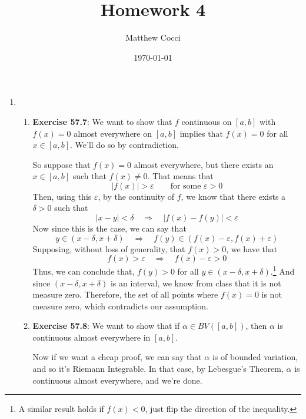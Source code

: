 \documentclass[12pt]{article}
\author{Matthew Cocci}
\title{\textbf{Homework 4}}
\date{\today}
\theoremstyle{plain}
\theoremstyle{definition}
\theoremstyle{remark}
\begin{document}
\maketitle 

\begin{enumerate}

\item 
\begin{enumerate}
\item \textbf{Exercise 57.7}: We want to show that $f$ continuous on $[a,b]$ with $f(x)=0$ almost everywhere on $[a,b]$ implies that $f(x)=0$ for all $x\in[a,b]$. We'll do so by contradiction.

So suppose that $f(x)=0$ almost everywhere, but there exists an $x\in[a,b]$ such that $f(x)\neq 0$. That means that 
\[ 
    |f(x)| > \varepsilon \qquad \text{for some $\varepsilon>0$}
\]
Then, using this $\varepsilon$, by the continuity of $f$, we know that there exists a $\delta>0$ such that
\[
    |x-y|<\delta \quad \Rightarrow \quad |f(x)-f(y)|<\varepsilon
\]
Now since this is the case, we can say that
\[
    y\in(x-\delta, x+\delta) \quad \Rightarrow \quad 
    f(y) \in \left(f(x)-\varepsilon, f(x)+\varepsilon\right)
\]
Supposing, without loss of generality, that $f(x) > 0$, we have that 
\[
    f(x) > \varepsilon \quad \Rightarrow \quad
    f(x) - \varepsilon > 0
\]
Thus, we can conclude that, $f(y) > 0$ for all $y\in(x-\delta, x+\delta)$.\footnote{A similar result holds if $f(x)<0$, just flip the direction of the inequality.} And since $(x-\delta, x+\delta)$ is an interval, we know from class that it is not measure zero. Therefore, the set of all points where $f(x)=0$ is not measure zero, which contradicts our assumption.

\item \textbf{Exercise 57.8}: We want to show that if $\alpha\in BV([a,b])$, then $\alpha$ is continuous almost everywhere in $[a,b]$.  

Now if we want a cheap proof, we can say that $\alpha$ is of bounded variation, and so it's Riemann Integrable. In that case, by Lebesgue's Theorem, $\alpha$ is continuous almost everywhere, and we're done.


\end{enumerate}
\end{enumerate}
\end{document}
